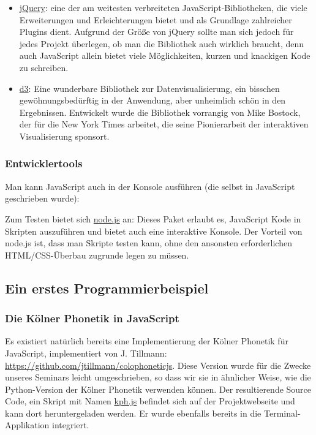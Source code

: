 \begin{itemize}
\itemsep1pt\parskip0pt
\item
  {\href{http://jquery.com}{jQuery}: eine der am weitesten verbreiteten
  JavaScript-Bibliotheken, die viele Erweiterungen und Erleichterungen
  bietet und als Grundlage zahlreicher Plugins dient. Aufgrund der Größe
  von jQuery sollte man sich jedoch für jedes Projekt überlegen, ob man
  die Bibliothek auch wirklich braucht, denn auch JavaScript allein
  bietet viele Möglichkeiten, kurzen und knackigen Kode zu schreiben.}
\item
  {\href{http://d3js.org}{d3}: Eine wunderbare Bibliothek zur
  Datenvisualisierung, ein bisschen gewöhnungsbedürftig in der
  Anwendung, aber unheimlich schön in den Ergebnissen. Entwickelt wurde
  die Bibliothek vorrangig von Mike Bostock, der für die New York Times
  arbeitet, die seine Pionierarbeit der interaktiven Visualisierung
  sponsort.}
\end{itemize}


\subsubsection{\texorpdfstring{{Entwicklertools}}{Entwicklertools}}

Man kann JavaScript auch in der Konsole ausführen (die selbst in
JavaScript geschrieben wurde):

{ Zum Testen bietet sich \href{http://nodejs.org}{node.js} an: Dieses
Paket erlaubt es, JavaScript Kode in Skripten auszuführen und bietet
auch eine interaktive Konsole. Der Vorteil von node.js ist, dass man
Skripte testen kann, ohne den ansonsten erforderlichen HTML/CSS-Überbau
zugrunde legen zu müssen. }

\subsection{\texorpdfstring{{Ein erstes
Programmierbeispiel}}{Ein erstes Programmierbeispiel}}

\subsubsection{\texorpdfstring{{Die Kölner Phonetik in
JavaScript}}{Die Kölner Phonetik in JavaScript}}

{ Es existiert natürlich bereits eine Implementierung der Kölner
Phonetik für JavaScript, implementiert von J. Tillmann:
\url{https://github.com/jtillmann/colophoneticjs}. Diese Version wurde
für die Zwecke unseres Seminars leicht umgeschrieben, so dass wir sie in
ähnlicher Weise, wie die Python-Version der Kölner Phonetik verwenden
können. Der resultierende Source Code, ein Skript mit Namen
\href{https://github.com/LinguList/pyjs-seminar/blob/master/website/code/kph.js}{kph.js}
befindet sich auf der Projektwebseite und kann dort heruntergeladen
werden. Er wurde ebenfalls bereits in die Terminal-Applikation
integriert. }



